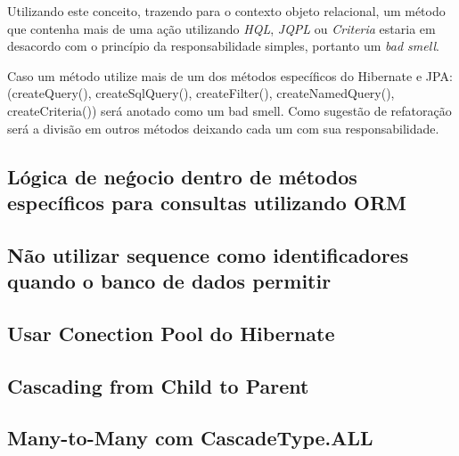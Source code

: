 Utilizando este conceito, trazendo para o contexto objeto relacional, um método que contenha mais de uma ação utilizando \textit{HQL}, \textit{JQPL} ou \textit{Criteria} estaria em desacordo com o princípio da responsabilidade simples, portanto um \textit{bad smell}.   

Caso um método utilize mais de um dos métodos específicos do Hibernate e JPA: (createQuery(), createSqlQuery(), createFilter(), createNamedQuery(), createCriteria()) será anotado como um bad smell. Como sugestão de refatoração será a divisão em outros métodos deixando cada um com sua responsabilidade.
%

\subsection{Lógica de neǵocio dentro de métodos específicos para consultas utilizando ORM}

\subsection{Não utilizar sequence como identificadores quando o banco de dados permitir}

\subsection{Usar Conection Pool do Hibernate}

\subsection{Cascading from Child to Parent}

\subsection{Many-to-Many com CascadeType.ALL} 


